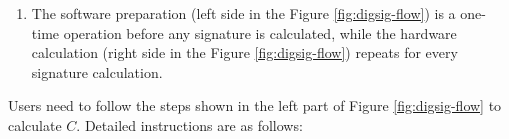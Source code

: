 \documentclass[main\_\_EN.tex]{subfiles}
\begin{document}
\begin{tiplisting}
\vspace{-2.5em}
\begin{enumerate}
\item The software preparation (left side in the Figure \ref{fig:digsig-flow}) is a one-time operation before any signature is calculated, while the hardware calculation (right side in the Figure \ref{fig:digsig-flow}) repeats for every signature calculation.
\end{enumerate}
\end{tiplisting}


Users need to follow the steps shown in the left part of Figure \ref{fig:digsig-flow} to calculate \begin{math}C\end{math}. Detailed instructions are as follows:
\end{document}

